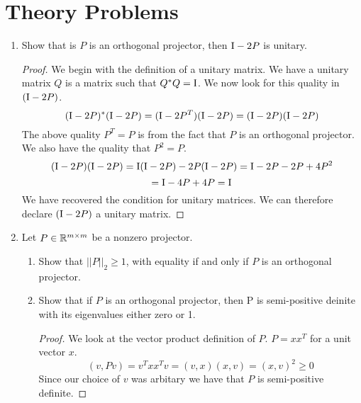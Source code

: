 \documentclass{article}
\begin{document}
\section{Theory Problems}
\begin{enumerate}

\item %
Show that is $P$ is an orthogonal projector, then $\mathrm{I} - 2P$ is unitary. 

\begin{proof}
    We begin with the definition of a unitary matrix. We have a unitary matrix $Q$ is a matrix such that $Q^*Q = \mathrm{I}$. We now look for this quality in $(\mathrm{I} - 2P)$. 
    \[
        (\mathrm{I} - 2P)^*(\mathrm{I} - 2P) = (\mathrm{I} - 2P^T)(\mathrm{I} - 2P) = (\mathrm{I} - 2P)(\mathrm{I} - 2P)
    \]
    The above quality $P^T = P$ is from the fact that $P$ is an orthogonal projector. We also have the quality that $P^2 = P$.
    \[
        (\mathrm{I} - 2P)(\mathrm{I} - 2P) = \mathrm{I}(\mathrm{I} - 2P) - 2P(\mathrm{I} - 2P) = \mathrm{I} - 2P - 2P + 4P^2
    \]
    \[
        = \mathrm{I} - 4P +4P = \mathrm{I}
    \]  
    We have recovered the condition for unitary matrices. We can therefore declare $(\mathrm{I} - 2P)$ a unitary matrix. 
\end{proof}


\item %
Let $P \in \mathbb{R}^{m \times m}$ be a nonzero projector. 
\begin{enumerate}
    \item Show that $||P||_2 \ge 1$, with equality if and only if $P$ is an orthogonal projector. 

    \item Show that if $P$ is an orthogonal projector, then P is semi-positive deinite with its eigenvalues either zero or 1. 
        \begin{proof}
            We look at the vector product definition of $P$. $P = xx^T$ for a unit vector $x$. 
            \[
                (v, Pv) = v^Txx^Tv = (v, x)(x, v) = (x, v)^2 \ge 0
            \]
            Since our choice of $v$ was arbitary we have that $P$ is semi-positive definite. 
            

\end{proof}
\end{enumerate}
\end{enumerate}
\end{document}
